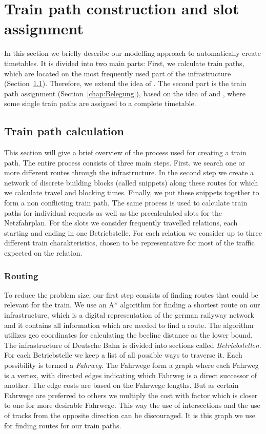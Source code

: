 \section{Train path construction and slot assignment}
\label{chap:methods}
%
In this section we briefly describe our modelling approach to automatically create timetables. It is divided into two main parts: First, we calculate train paths, which are located on the most frequently used part of the infrastructure (Section~\ref{chap:Konstruktion}). Therefore, we extend the idea of \cite{O:2009}. The second part is the train path assignment (Section~\ref{chap:Belegung}), based on the idea of \cite{N:1998, N:2015} and \cite{NO:2014}, where some single train paths are assigned to a complete timetable.


\subsection{Train path calculation}
\label{chap:Konstruktion}
%
This section will give a brief overview of the process used for creating a train path. The entire process consists of three main steps. First, we search one or more different routes through the infrastructure. In the second step we create a network of discrete building blocks (called snippets) along these routes for which we calculate travel and blocking times. Finally, we put these snippets together to form a non conflicting train path. The same process is used to calculate train paths for individual requests as well as the precalculated slots for the Netzfahrplan. For the slots we consider frequently travelled relations, each starting and ending in one Betriebstelle. For each relation we consider up to three different train charakteristics, chosen to be representative for most of the traffic expected on the relation.


\subsubsection{Routing}
To reduce the problem size, our first step consists of finding routes that could be relevant for the train. We use an A* algorithm for finding a shortest route on our infrastructure, which is a digital representation of the german railyway network and it contains all information which are needed to find a route. The algorithm utilizes geo coordinates for calculating the beeline distance as the lower bound. The infrastructure of Deutsche Bahn is divided into sections called \emph{Betriebstellen}.
For each Betriebstelle we keep a list of all possible ways to traverse it. Each possibility is termed a \emph{Fahrweg}. The Fahrwege form a graph where each Fahrweg is a vertex, with directed edges indicating which Fahrweg is a direct successor of another. The edge costs are based on the Fahrwege lengths.
But as certain Fahrwege are preferred to others we multiply the cost with factor which is closer to one for more desirable Fahrwege. This way the use of intersections and the use of tracks from the opposite direction can be discouraged. It is this graph we use for finding routes for our train paths.

